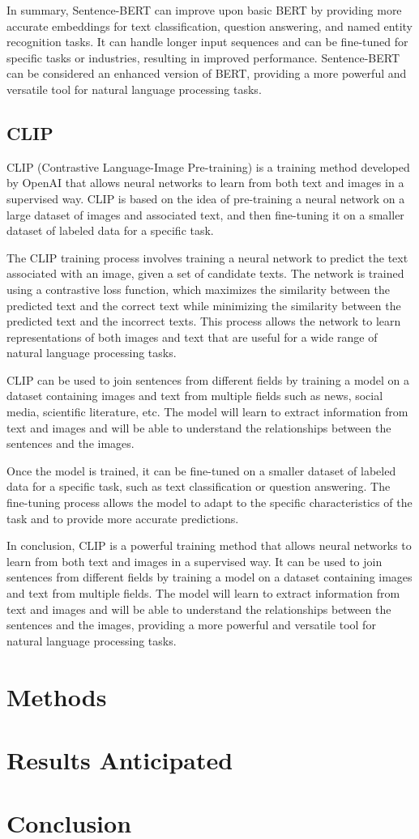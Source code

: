 \documentclass[PI]{ProjectProposal}
\begin{document}
In summary, Sentence-BERT can improve upon basic BERT by providing more accurate embeddings for text classification, question answering, and named entity recognition tasks. It can handle longer input sequences and can be fine-tuned for specific tasks or industries, resulting in improved performance. Sentence-BERT can be considered an enhanced version of BERT, providing a more powerful and versatile tool for natural language processing tasks.
\section{CLIP}
\label{sec:org5155115}
CLIP (Contrastive Language-Image Pre-training) is a training method developed by OpenAI that allows neural networks to learn from both text and images in a supervised way. CLIP is based on the idea of pre-training a neural network on a large dataset of images and associated text, and then fine-tuning it on a smaller dataset of labeled data for a specific task.

The CLIP training process involves training a neural network to predict the text associated with an image, given a set of candidate texts. The network is trained using a contrastive loss function, which maximizes the similarity between the predicted text and the correct text while minimizing the similarity between the predicted text and the incorrect texts. This process allows the network to learn representations of both images and text that are useful for a wide range of natural language processing tasks.

CLIP can be used to join sentences from different fields by training a model on a dataset containing images and text from multiple fields such as news, social media, scientific literature, etc. The model will learn to extract information from text and images and will be able to understand the relationships between the sentences and the images.

Once the model is trained, it can be fine-tuned on a smaller dataset of labeled data for a specific task, such as text classification or question answering. The fine-tuning process allows the model to adapt to the specific characteristics of the task and to provide more accurate predictions.

In conclusion, CLIP is a powerful training method that allows neural networks to learn from both text and images in a supervised way. It can be used to join sentences from different fields by training a model on a dataset containing images and text from multiple fields. The model will learn to extract information from text and images and will be able to understand the relationships between the sentences and the images, providing a more powerful and versatile tool for natural language processing tasks.
\chapter{Methods}
\label{sec:org9786297}
\chapter{Results Anticipated}
\label{sec:org48a358f}
\chapter{Conclusion}
\label{sec:orge6dcb78}
\putbibliography
\appendix
\end{document}
